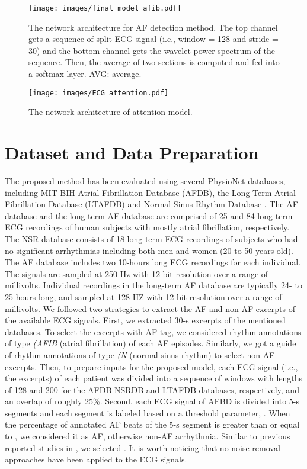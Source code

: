 \documentclass[conference]{IEEEtran}
\begin{document}
\begin{figure*}[htb]
\centering
\texttt{[image: images/final\_model\_afib.pdf]}
  \caption{The network architecture for AF detection method. The top channel gets a sequence of split ECG signal (i.e., window = 128 and stride = 30) and the bottom channel gets the wavelet power spectrum of the sequence. Then, the average of two sections is computed and fed into a softmax layer. AVG: average.} 
  \label{fig:final-model}
\end{figure*}


\begin{figure}[htb]
\centering
\texttt{[image: images/ECG\_attention.pdf]}
  \caption{The network architecture of attention model.}
  \label{fig:ecg_attention}

\end{figure}


\section{Dataset and Data Preparation} 
\label{sec:dataset}
The proposed method has been evaluated using several PhysioNet databases, including  MIT-BIH Atrial Fibrillation Database (AFDB), the Long-Term Atrial Fibrillation Database (LTAFDB)
and Normal Sinus Rhythm Database \cite{PhysioNet}. The AF database and the long-term AF database are comprised of 25 and 84 long-term ECG recordings of human subjects with mostly atrial fibrillation, respectively. The NSR database consists of 18 long-term ECG recordings of subjects who had no significant arrhythmias including both men and women (20 to 50 years old). The AF database includes two 10-hours long ECG recordings for each individual. The signals are sampled at 250 Hz with 12-bit resolution over a range of  millivolts. Individual recordings in the long-term AF database are typically 24- to 25-hours long, and sampled at 128 HZ with 12-bit resolution over a range of  millivolts. 
We followed two strategies to extract the AF and non-AF excerpts of the available ECG signals. First, we extracted 30-s excerpts of the mentioned databases. To select the excerpts with AF tag, we considered rhythm annotations of type \textit{(AFIB} (atrial fibrillation) of each AF episodes. Similarly, we got a guide of rhythm annotations of type \textit{(N} (normal sinus rhythm) to select non-AF excerpts. Then, to prepare inputs for the proposed model, each ECG signal (i.e., the excerpts) of each patient was divided into a sequence of windows with lengths of 128 and 200 for the AFDB-NSRDB and LTAFDB databases, respectively, and an overlap of roughly 25\%. Second, each ECG signal of AFBD is divided into 5-s segments and each segment is labeled based on a threshold parameter, . When the percentage of annotated AF beats of the 5-s segment is greater than or equal to , we considered it as AF, otherwise non-AF arrhythmia. Similar to previous reported studies in \cite{xia2018detecting,asgari2015automatic}, we selected . It is worth noticing that no noise removal approaches have been applied to the ECG signals.  
\end{document}
